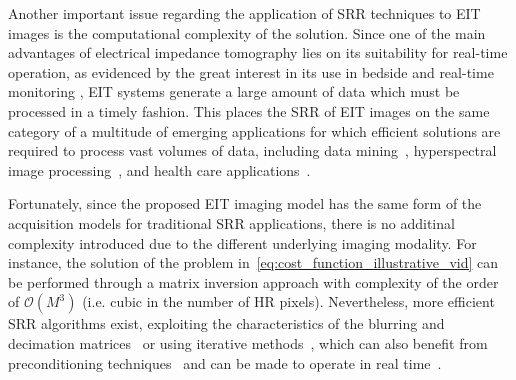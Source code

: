 \documentclass[10pt]{IEEEtran}
\newcommand{\cred}{}
\begin{document}
%
%
Another important issue regarding the application of SRR techniques to EIT images is the computational complexity of the solution. 
%
Since one of the main advantages of electrical impedance tomography lies on its suitability for real-time operation, as evidenced by the great interest in its use in bedside and real-time monitoring \cite{adler2012whitherLungEIT}, EIT systems generate a large amount of data which must be processed in a timely fashion.
%
This places the SRR of EIT images on the same category of a multitude of emerging applications for which efficient solutions are required to process vast volumes of data, including data mining~\cite{wu2014dataMining}, hyperspectral image processing~\cite{borsoi2017tech,imbiriba2018low}, and health care applications~\cite{belle2015big}.








Fortunately, since the proposed EIT imaging model has the same form of the acquisition models for traditional SRR applications, there is no additinal complexity introduced due to the different underlying imaging modality.
%
For instance, the solution of the problem in~\eqref{eq:cost_function_illustrative_vid} can be performed through a matrix inversion approach with complexity of the order of $\mathcal{O}(M^3)$ (i.e. cubic in the number of HR pixels).
%
Nevertheless, more efficient SRR algorithms exist, exploiting the characteristics of the blurring and decimation matrices~\cite{elad1997srr_simple} or using iterative methods~\cite{Elad99}, which can also benefit from preconditioning techniques~\cite{Nasrollahi14} and can be made to operate in real time~\cite{borsoi2017srr_jrnl}.
\end{document}
